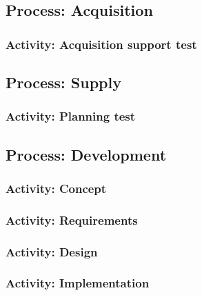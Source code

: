 	\subsection{Process: Acquisition} \label{s:details-of-the-master-test-plan:process-acquisiton}
	
	\subsubsection{Activity: Acquisition support test} \label{s:details-of-the-master-test-plan:activitiy-acquisition-support-test} 
	
	\subsection{Process: Supply} \label{s:details-of-the-master-test-plan:process-supply}
	
	\subsubsection{Activity: Planning test} \label{s:details-of-the-master-test-plan:activity-planning-tests}
	
	\subsection{Process: Development} \label{s:details-of-the-master-test-plan:process-development}
	
	\subsubsection{Activity: Concept} \label{s:details-of-the-master-test-plan:activity-concept}
	
	\subsubsection{Activity: Requirements} \label{s:details-of-the-master-test-plan:activity-requirements}
	
	\subsubsection{Activity: Design} \label{s:details-of-the-master-test-plan:activity-design}
	
	\subsubsection{Activity: Implementation} \label{s:details-of-the-master-test-plan:activity-implementation}
	
